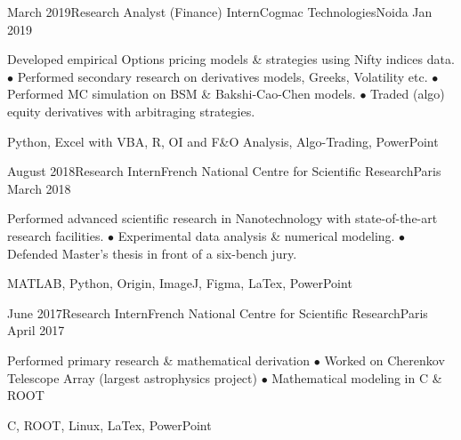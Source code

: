 \begin{experiences}
   \experience
    {March 2019}{Research Analyst (Finance) Intern}{Cogmac Technologies}{Noida}
    {Jan 2019}
    {
\begin{description}
    Developed empirical Options pricing models \& strategies using Nifty indices data. $\bullet$ Performed secondary research on derivatives models, Greeks, Volatility etc. $\bullet$ Performed MC simulation on BSM \& Bakshi-Cao-Chen models. $\bullet$ Traded (algo) equity derivatives with arbitraging strategies.
    \end{description}
    }
{Python, Excel with VBA, R, OI and F\&O Analysis, Algo-Trading, PowerPoint}
\end{experiences}

\begin{experiences}
  \experience
    {August 2018}{Research Intern}{French National Centre for Scientific Research}{Paris}
    {March 2018}
    {
\begin{description}
Performed advanced scientific research in Nanotechnology with state-of-the-art research facilities. $\bullet$ Experimental data analysis \& numerical modeling. $\bullet$ Defended Master's thesis in front of a six-bench jury.
\end{description}
}
    {MATLAB, Python, Origin, ImageJ, Figma, LaTex, PowerPoint}
\end{experiences}

\begin{experiences}
  \experience
    {June 2017}{Research Intern}{French National Centre for Scientific Research}{Paris}
    {April 2017}
    {
\begin{description}
Performed primary research \& mathematical derivation $\bullet$ Worked on Cherenkov Telescope Array (largest astrophysics project) $\bullet$ Mathematical modeling in C \& ROOT
\end{description}
}
    {C, ROOT, Linux, LaTex, PowerPoint}
\end{experiences} 